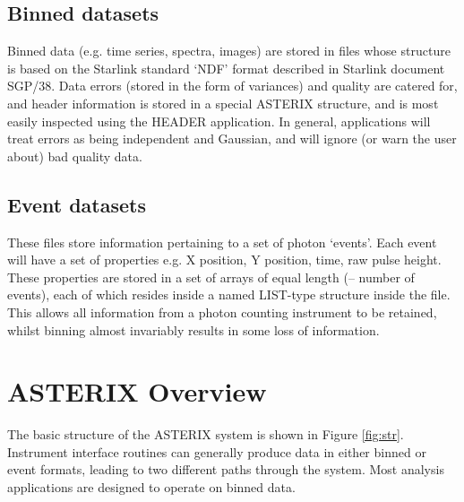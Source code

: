 \subsection{Binned datasets }

Binned data (e.g. time series, spectra, images) are stored in files whose
structure is based on the Starlink standard `NDF' format described in Starlink
document SGP/38. Data errors (stored in the form of variances)  and quality are
catered for, and header information is stored in a special ASTERIX structure,
and is most easily inspected using the HEADER  application. In  general,
applications will treat errors as being independent  and Gaussian, and will
ignore (or warn the user about) bad quality data.

\subsection{Event datasets }

These files store information pertaining to a set of photon `events'. Each 
event will have a set of properties  e.g. X position, Y position, time, raw
pulse height. These properties are stored in a set of arrays of equal length
(-- number of events), each of which resides inside  a named LIST-type
structure inside the file. This allows all information from a photon counting
instrument to be  retained, whilst binning almost invariably results in some
loss of information.

\section{ASTERIX Overview }

The basic structure of the ASTERIX system is shown in Figure \ref{fig:str}.
Instrument interface routines can generally produce data in either binned or
event formats, leading to two different paths through the system. Most
analysis applications are designed to operate on binned data.


